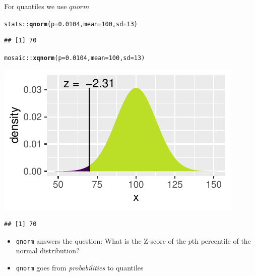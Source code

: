 \documentclass[10pt,handout]{beamer}\usepackage[]{graphicx}\usepackage[]{color}
\makeatletter
\newcommand{\hlnum}[1]{\textcolor[rgb]{0.686,0.059,0.569}{#1}}%
\newcommand{\hlopt}[1]{\textcolor[rgb]{0,0,0}{#1}}%
\newcommand{\hlstd}[1]{\textcolor[rgb]{0.345,0.345,0.345}{#1}}%
\newcommand{\hlkwc}[1]{\textcolor[rgb]{0.333,0.667,0.333}{#1}}%
\newcommand{\hlkwd}[1]{\textcolor[rgb]{0.737,0.353,0.396}{\textbf{#1}}}%
\newenvironment{kframe}{%
 \def\at@end@of@kframe{}%
 \ifinner\ifhmode%
  \def\at@end@of@kframe{\end{minipage}}%
  \begin{minipage}{\columnwidth}%
 \fi\fi%
 \def\FrameCommand##1{\hskip\@totalleftmargin \hskip-\fboxsep
 \colorbox{shadecolor}{##1}\hskip-\fboxsep
     \hskip-\linewidth \hskip-\@totalleftmargin \hskip\columnwidth}%
 \MakeFramed {\advance\hsize-\width
   \@totalleftmargin\z@ \linewidth\hsize
   \@setminipage}}%
 {\par\unskip\endMakeFramed%
 \at@end@of@kframe}
\newenvironment{knitrout}{}{} %
\makeatother
\begin{document}
\begin{frame}[fragile]{For quantiles we use $qnorm$}
	
	
	
\begin{knitrout}\tiny
{}\color{fgcolor}\begin{kframe}
\begin{alltt}
\hlstd{stats}\hlopt{::}\hlkwd{qnorm}\hlstd{(}\hlkwc{p} \hlstd{=} \hlnum{0.0104}\hlstd{,} \hlkwc{mean} \hlstd{=} \hlnum{100}\hlstd{,} \hlkwc{sd} \hlstd{=} \hlnum{13}\hlstd{)}
\end{alltt}
\begin{verbatim}
## [1] 70
\end{verbatim}
\end{kframe}
\end{knitrout}
	
	\pause 
	
\begin{knitrout}\tiny
{}\color{fgcolor}\begin{kframe}
\begin{alltt}
\hlstd{mosaic}\hlopt{::}\hlkwd{xqnorm}\hlstd{(}\hlkwc{p} \hlstd{=} \hlnum{0.0104}\hlstd{,} \hlkwc{mean} \hlstd{=} \hlnum{100}\hlstd{,} \hlkwc{sd} \hlstd{=} \hlnum{13}\hlstd{)}
\end{alltt}
\end{kframe}

{\centering \includegraphics[width=0.6\linewidth]{figure/probs5-1} 

}


\begin{kframe}\begin{verbatim}
## [1] 70
\end{verbatim}
\end{kframe}
\end{knitrout}
	
	\pause 
	
	\small{
		\begin{itemize}
			\item \texttt{qnorm} answers the question: What is the Z-score of the $p$th percentile of the normal distribution?
			
			\item \texttt{qnorm} goes from \textit{probabilities} to quantiles 
		\end{itemize}
	}
\end{frame}
\end{document}
